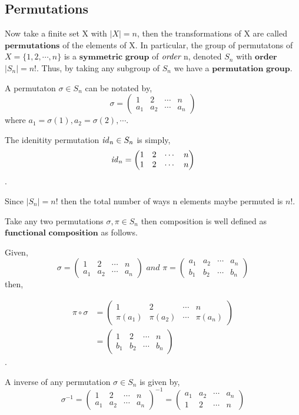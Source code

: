 \subsection{Permutations} %
\label{sec:permutations}
Now take a finite set X with $|X|=n$, then the transformations of X are called $\textbf{permutations}$ of the
elements of X. In particular, the group of permutatons of $X=\{ 1, 2, \cdots, n \}$ is a $\textbf{symmetric group}$ of
$\emph{order}$ n, denoted $S_n$ with $\textbf{order}$ $|S_n|=n!$. Thus, by taking any subgroup of $S_n$ we have a
$\textbf{permutation group}$.

A permutaton $\sigma \in S_n$ can be notated by,
\[
 \sigma =
 \begin{pmatrix}
  1 & 2 & \cdots & n \\
  a_1 & a_2 & \cdots & a_n
 \end{pmatrix}
\]
where $a_1 = \sigma(1), a_2 = \sigma(2), \cdots$.

The idenitity permutation $\mathit{id}_{n} \in S_n$ is simply,
\[
 \mathit{id}_{n} =
 \begin{pmatrix}
  1 & 2 & \cdots & n \\
  1 & 2 & \cdots & n
 \end{pmatrix}
\].

Since $|S_n|=n!$ then the total number of ways n elements maybe permuted is $n!$.

Take any two permutations $\sigma,\pi \in S_n$ then composition is well defined as $\textbf{functional composition}$
as follows.

Given,
\[
 \sigma =
 \begin{pmatrix}
  1 & 2 & \cdots & n \\
  a_1 & a_2 & \cdots & a_n
 \end{pmatrix}
 \, \, and \, \,
 \pi =
 \begin{pmatrix}
  a_1 & a_2 & \cdots & a_n \\
  b_1 & b_2 & \cdots & b_n
 \end{pmatrix}
\]
then,

\begin{align*}
 \pi \circ \sigma &=
 \begin{pmatrix}
  1 & 2 & \cdots & n \\
  \pi(a_1) & \pi(a_2) & \cdots & \pi(a_n)
 \end{pmatrix}
 \\
 &=
 \begin{pmatrix}
  1 & 2 & \cdots & n \\
  b_1 & b_2 & \cdots & b_n
 \end{pmatrix}
\end{align*}
.

A inverse of any permutation $\sigma \in S_n$ is given by,
\[
 \sigma^{-1} =
 \begin{pmatrix}
  1 & 2 & \cdots & n \\
  a_1 & a_2 & \cdots & a_n
 \end{pmatrix}^{-1}
 =
 \begin{pmatrix}
  a_1 & a_2 & \cdots & a_n \\
  1 & 2 & \cdots & n
 \end{pmatrix}
\]
